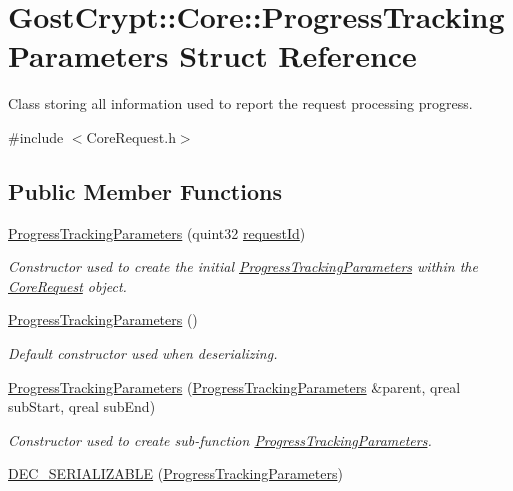 \hypertarget{struct_gost_crypt_1_1_core_1_1_progress_tracking_parameters}{}\section{Gost\+Crypt\+:\+:Core\+:\+:Progress\+Tracking\+Parameters Struct Reference}
\label{struct_gost_crypt_1_1_core_1_1_progress_tracking_parameters}


Class storing all information used to report the request processing progress.  




{\ttfamily \#include $<$Core\+Request.\+h$>$}

\subsection*{Public Member Functions}
\begin{DoxyCompactItemize}
\item 
\hyperlink{struct_gost_crypt_1_1_core_1_1_progress_tracking_parameters_a92eed387fce314d533b9c7ddeda53d49}{Progress\+Tracking\+Parameters} (quint32 \hyperlink{struct_gost_crypt_1_1_core_1_1_progress_tracking_parameters_a4359b9c9116512f80f119936da069a80}{request\+Id})
\begin{DoxyCompactList}\small\item\em Constructor used to create the initial \hyperlink{struct_gost_crypt_1_1_core_1_1_progress_tracking_parameters}{Progress\+Tracking\+Parameters} within the \hyperlink{struct_gost_crypt_1_1_core_1_1_core_request}{Core\+Request} object. \end{DoxyCompactList}\item 
\hyperlink{struct_gost_crypt_1_1_core_1_1_progress_tracking_parameters_a61e5bd2a93fe4555fecbaa22a6ebd49b}{Progress\+Tracking\+Parameters} ()
\begin{DoxyCompactList}\small\item\em Default constructor used when deserializing. \end{DoxyCompactList}\item 
\hyperlink{struct_gost_crypt_1_1_core_1_1_progress_tracking_parameters_a6fe907790e9405e364bf3334396128b6}{Progress\+Tracking\+Parameters} (\hyperlink{struct_gost_crypt_1_1_core_1_1_progress_tracking_parameters}{Progress\+Tracking\+Parameters} \&parent, qreal sub\+Start, qreal sub\+End)
\begin{DoxyCompactList}\small\item\em Constructor used to create sub-\/function \hyperlink{struct_gost_crypt_1_1_core_1_1_progress_tracking_parameters}{Progress\+Tracking\+Parameters}. \end{DoxyCompactList}\item 
\hyperlink{struct_gost_crypt_1_1_core_1_1_progress_tracking_parameters_a546deb6e3ee706c22bc01078369ce53c}{D\+E\+C\+\_\+\+S\+E\+R\+I\+A\+L\+I\+Z\+A\+B\+LE} (\hyperlink{struct_gost_crypt_1_1_core_1_1_progress_tracking_parameters}{Progress\+Tracking\+Parameters})
\end{DoxyCompactItemize}
